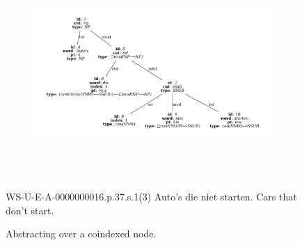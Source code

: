 \begin{figure}[htbp]
	\begin{subfigure}{1\textwidth}
		\includegraphics[width=1\textwidth, trim={1.5cm 1.5cm 1.5cm 1.5cm}]{./prebuilt/simple_abstraction.pdf}\\[\smallsep]
	\end{subfigure}\\[\midsep]
	\begin{subfigure}{1\textwidth}
	\end{subfigure}\\[\smallsep]
	\aethelcap
		{WS-U-E-A-0000000016.p.37.s.1(3)}
		{Auto's die niet starten.}
		{Cars that don't start.}
		{}
	\caption{Abstracting over a coindexed node.}
	\label{figure:simple_abstraction}
\end{figure}

